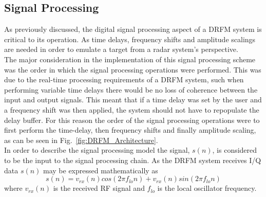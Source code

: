 	\subsection{Signal Processing}
	\noindent As previously discussed, the digital signal processing aspect of a DRFM system is critical to its operation. As time delays, frequency shifts and amplitude scalings are needed in order to emulate a target from a radar system's perspective. \\ \newline The major consideration in the implementation of this signal processing scheme was the order in which the signal processing operations were performed. This was due to the real-time processing requirements of a DRFM system, such when performing variable time delays there would be no loss of coherence between the input and output signals. This meant that if a time delay was set by the user and a frequency shift was then applied, the system should not have to repopulate the delay buffer. For this reason the order of the signal processing operations were to first perform the time-delay, then frequency shifts and finally amplitude scaling, as can be seen in Fig.~\ref{fig:DRFM_Architecture}. \\ \newline In order to describe the signal processing model the signal, $s(n)$, is considered to be the input to the signal processing chain. As the DRFM system receives I/Q data $s(n)$ may be  expressed mathematically as 
	\begin{equation}
		s(n) = v_{rx}(n)cos(2\pi f_{lo} n) + v_{rx}(n)sin(2\pi f_{lo} n) 
	\end{equation}
	\noindent where $v_{rx}(n)$ is the received RF signal and $f_{lo}$ is the local oscillator frequency.\\
		
